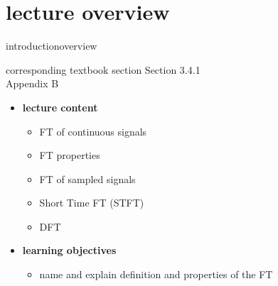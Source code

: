 


\subtitle{Module 3.4.1: Time-Frequency Representations~---~Fourier Transform}


	

    \section[overview]{lecture overview}
        \begin{frame}{introduction}{overview}
            \begin{block}{corresponding textbook section}
                    Section 3.4.1\\
                    Appendix B
            \end{block}

            \begin{itemize}
                \item   \textbf{lecture content}
                    \begin{itemize}
                        \item   FT of continuous signals  
                        \item   FT properties
                        \item   FT of sampled signals
                        \item   Short Time FT (STFT)
                        \item   DFT
                    \end{itemize}
                \bigskip
                \item<2->   \textbf{learning objectives}
                    \begin{itemize}
                        \item   name and explain definition and properties of the FT
                    \end{itemize}
            \end{itemize}
        \end{frame}

